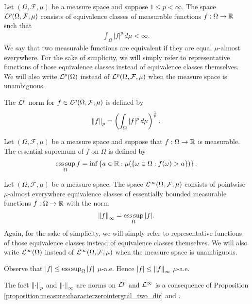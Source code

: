 \begin{definition}
Let $(\Omega, \mathcal{F}, \mu)$ be a measure space and suppose $1 \leq p < \infty$. The space ${\mathcal {L}^p}(\Omega, \mathcal{F}, \mu)$ consists of equivalence classes of measurable functions $f : \Omega \to {\mathbb R}$ such that
\begin{align*}
    \int_{\Omega} | f| ^ p \,d\mu < \infty.
\end{align*}
We say that two measurable functions are equivalent if they are equal $\mu$-almost everywhere.
For the sake of simplicity, we will simply refer to representative functions of those equivalence classes instead
of equivalence classes themselves. We will also write ${\mathcal {L}^p}(\Omega)$ instead of ${\mathcal {L}^p}(\Omega, \mathcal{F}, \mu)$ when the measure space is unambiguous.
\end{definition}
The ${\mathcal {L}^p}$ norm for $f \in {\mathcal {L}^p}(\Omega, \mathcal{F}, \mu)$ is defined by
\begin{align*}
    \left\lVert f\right\rVert_p = \left ( \int_\Omega |f|^p \,d\mu \right )^{\frac{1}{p}}.
\end{align*}
\begin{definition}
\label{defn:lp:esssup}
Let $(\Omega, \mathcal{F}, \mu)$ be a measure space and suppose that $f : \Omega \to {\mathbb R}$ is measurable. The essential supremum of $f$ on $\Omega$ is defined by
\begin{align*}
    \operatorname*{ess\,sup}_{\Omega}f = \inf \left \{ a \in {\mathbb R} : \mu (\{ \omega \in \Omega : f(\omega) > a \}) \right \}.
\end{align*}
\end{definition}
\begin{definition}
Let $(\Omega, \mathcal{F}, \mu)$ be a measure space. The space ${\mathcal {L}^\infty}(\Omega, \mathcal{F}, \mu)$ consists of pointwise $\mu$-almost everywhere equivalence classes of essentially bounded measurable functions $f : \Omega \to {\mathbb R}$ with the norm
\begin{align*}
    \left\lVert f\right\rVert_\infty = \operatorname*{ess\,sup}_{\Omega} |f|.
\end{align*}
Again, for the sake of simplicity, we will simply refer to representative functions of those equivalence classes instead
of equivalence classes themselves. We will also write ${\mathcal {L}^\infty}(\Omega)$ instead of ${\mathcal {L}^\infty}(\Omega, \mathcal{F}, \mu)$ when the measure space is unambiguous.
\end{definition}
\begin{remark}
\label{remark:lp:inftynorm}
Observe that $|f| \leq \operatorname*{ess\,sup}_{\Omega}|f|$ $\mu$-a.e. Hence $|f| \leq \left\lVert f\right\rVert_\infty$ $\mu$-a.e.
\end{remark}
\begin{remark}
The fact $\left\lVert\cdot\right\rVert_p$ and $\left\lVert\cdot\right\rVert_\infty$ are norms on ${\mathcal {L}^p}$ and ${\mathcal {L}^\infty}$ is a consequence of Proposition \ref{proposition:measure:characterzerointergral_two_dir} and .
\end{remark}